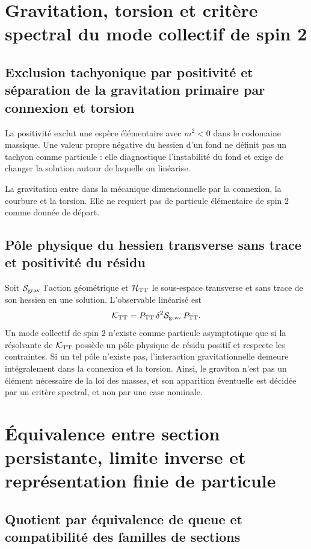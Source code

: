 \section{Gravitation, torsion et critère spectral du mode collectif de spin 2}

\subsection{Exclusion tachyonique par positivité et séparation de la gravitation primaire par connexion et torsion}

La positivité exclut une espèce élémentaire avec \(m^2<0\) dans le
codomaine massique. Une valeur propre négative du hessien d'un fond ne définit pas un
tachyon comme particule : elle diagnostique l'instabilité du fond et exige de changer
la solution autour de laquelle on linéarise.

La gravitation entre dans la mécanique dimensionnelle par la connexion, la courbure et la torsion. Elle ne requiert pas de particule élémentaire de spin \(2\) comme donnée de départ.

\subsection{Pôle physique du hessien transverse sans trace et positivité du résidu}

Soit \(\mathcal S_{\rm grav}\) l'action géométrique et \(\mathcal H_{\rm TT}\) le sous-espace transverse et sans trace de son hessien en une solution. L'observable linéarisé est
\[
 \mathcal K_{\rm TT}
 =P_{\rm TT}\,\delta^2\mathcal S_{\rm grav}\,P_{\rm TT}.
\]
Un mode collectif de spin \(2\) n'existe comme particule asymptotique que
si la résolvante de \(\mathcal K_{\rm TT}\) possède un pôle physique de résidu
positif et respecte les contraintes. Si un tel pôle n'existe pas, l'interaction
gravitationnelle demeure intégralement dans la connexion et la torsion. Ainsi, le
graviton n'est pas un élément nécessaire de la loi des masses, et son apparition éventuelle
est décidée par un critère spectral, et non par une case nominale.

\section{Équivalence entre section persistante, limite inverse et représentation finie de particule}

\subsection{Quotient par équivalence de queue et compatibilité des familles de sections}

